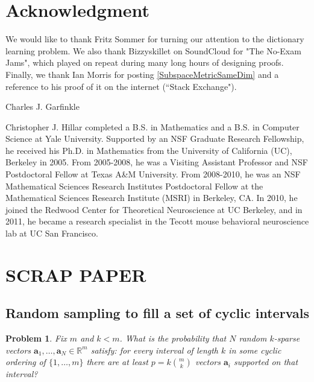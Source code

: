 \documentclass[journal, onecolumn]{IEEEtran}
\newtheorem{problem}{Problem}
\begin{document}

\section*{Acknowledgment}
We would like to thank Fritz Sommer for turning our attention to the dictionary learning problem. We also thank Bizzyskillet on SoundCloud for "The No-Exam Jams", which played on repeat during many long hours of designing proofs. Finally, we thank Ian Morris for posting \eqref{SubspaceMetricSameDim} and a reference to his proof of it on the internet (``Stack Exchange").






\begin{IEEEbiographynophoto}{Charles J. Garfinkle}
\end{IEEEbiographynophoto}

\begin{IEEEbiographynophoto}{Christopher J. Hillar}
completed a B.S. in Mathematics and a B.S. in Computer Science at Yale University.  Supported by an NSF Graduate Research Fellowship, he received his Ph.D. in Mathematics from the University of California (UC), Berkeley in 2005. From 2005-2008, he was a Visiting Assistant Professor and NSF Postdoctoral Fellow at Texas A\&M University. From 2008-2010, he was an NSF Mathematical Sciences Research Institutes Postdoctoral Fellow at the Mathematical Sciences Research Institute (MSRI) in Berkeley, CA.  In 2010, he joined the Redwood Center for Theoretical Neuroscience at UC Berkeley, and in 2011, he  became a research specialist in the Tecott mouse behavioral neuroscience lab at UC San Francisco.
\end{IEEEbiographynophoto}


\section*{SCRAP PAPER}

\subsection{ Random sampling to fill a set of cyclic intervals }
\begin{problem}
Fix $m$ and $k < m$. What is the probability that $N$ random $k$-sparse vectors $\mathbf{a}_1, \ldots, \mathbf{a}_N \in \mathbb{R}^m$ satisfy: for every interval of length $k$ in some cyclic ordering of $\{1, \ldots, m\}$ there are at least $p = k{m \choose k}$ vectors $\mathbf{a}_i$ supported on that interval?
\end{problem}
\end{document}
